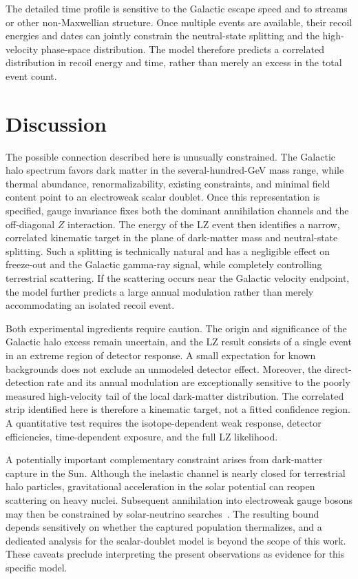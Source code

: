 \documentclass[aps,prd,twocolumn,nofootinbib,superscriptaddress]{revtex4-2}
\begin{document}
The detailed time profile is sensitive to the Galactic escape speed and to streams or other non-Maxwellian structure. Once multiple events are available, their recoil energies and dates can jointly constrain the neutral-state splitting and the high-velocity phase-space distribution. The model therefore predicts a correlated distribution in recoil energy and time, rather than merely an excess in the total event count.


\section{Discussion}

The possible connection described here is unusually constrained. The Galactic halo spectrum favors dark matter in the several-hundred-GeV mass range, while thermal abundance, renormalizability, existing constraints, and minimal field content point to an electroweak scalar doublet. Once this representation is specified, gauge invariance fixes both the dominant annihilation channels and the off-diagonal $Z$ interaction. The energy of the LZ event then identifies a narrow, correlated kinematic target in the plane of dark-matter mass and neutral-state splitting. Such a splitting is technically natural and has a negligible effect on freeze-out and the Galactic gamma-ray signal, while completely controlling terrestrial scattering. If the scattering occurs near the Galactic velocity endpoint, the model further predicts a large annual modulation rather than merely accommodating an isolated recoil event.

Both experimental ingredients require caution. The origin and significance of the Galactic halo excess remain uncertain, and the LZ result consists of a single event in an extreme region of detector response. A small expectation for known backgrounds does not exclude an unmodeled detector effect. Moreover, the direct-detection rate and its annual modulation are exceptionally sensitive to the poorly measured high-velocity tail of the local dark-matter distribution. The correlated strip identified here is therefore a kinematic target, not a fitted confidence region. A quantitative test requires the isotope-dependent weak response, detector efficiencies, time-dependent exposure, and the full LZ likelihood.

A potentially important complementary constraint arises from dark-matter capture in the Sun. Although the inelastic channel is nearly closed for terrestrial halo particles, gravitational acceleration in the solar potential can reopen scattering on heavy nuclei. Subsequent annihilation into electroweak gauge bosons may then be constrained by solar-neutrino searches~\cite{Catena:2018vzc}. The resulting bound depends sensitively on whether the captured population thermalizes, and a dedicated analysis for the scalar-doublet model is beyond the scope of this work. These caveats preclude interpreting the present observations as evidence for this specific model.
\end{document}
